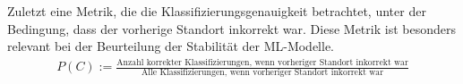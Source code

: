 Zuletzt eine Metrik, die die Klassifizierungsgenauigkeit betrachtet, unter der Bedingung, dass der vorherige Standort inkorrekt war.
Diese Metrik ist besonders relevant bei der Beurteilung der Stabilität der ML-Modelle.
\begin{align}
    \label{formular:accuracy_previous_was_in_correct}
    P(C) := \frac{\text{Anzahl korrekter Klassifizierungen, wenn vorheriger Standort inkorrekt war}}{\text{Alle Klassifizierungen, wenn vorheriger Standort inkorrekt war}}
\end{align}
